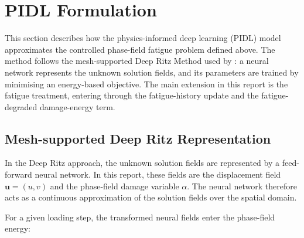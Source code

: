 



\section{PIDL Formulation}
\label{sec:c3_pidl_formulation}


This section describes how the physics-informed deep learning (PIDL) model approximates the controlled phase-field fatigue problem defined above. The method follows the mesh-supported Deep Ritz Method used by \citet{Manav2024cmame}: a neural network represents the unknown solution fields, and its parameters are trained by minimising an energy-based objective. The main extension in this report is the fatigue treatment, entering through the fatigue-history update and the fatigue-degraded damage-energy term.


\subsection{Mesh-supported Deep Ritz Representation}

\label{subsec:c3_deep_ritz_view}
In the Deep Ritz approach, the unknown solution fields are represented by a feed-forward neural network. In this report, these fields are the displacement field $\mathbf{u}=(u,v)$ and the phase-field damage variable $\alpha$. The neural network therefore acts as a continuous approximation of the solution fields over the spatial domain.

For a given loading step, the transformed neural fields enter the phase-field energy:


